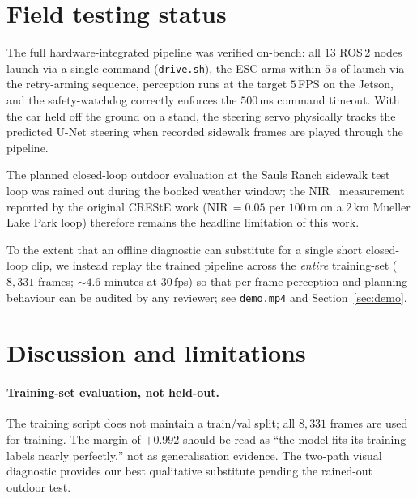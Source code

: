 \documentclass[conference]{IEEEtran}
\begin{document}
\section{Field testing status}
\label{sec:field}

The full hardware-integrated pipeline was verified on-bench: all $13$ ROS\,2
nodes launch via a single command (\texttt{drive.sh}), the ESC arms within
$5$\,s of launch via the retry-arming sequence, perception runs at the
target $5$\,FPS on the Jetson, and the safety-watchdog correctly enforces
the $500$\,ms command timeout. With the car held off the ground on a stand,
the steering servo physically tracks the predicted U-Net steering when
recorded sidewalk frames are played through the pipeline.

The planned closed-loop outdoor evaluation at the Sauls Ranch sidewalk
test loop was rained out during the booked weather window; the
NIR~\cite{creste} measurement reported by the original CREStE work
(NIR\,$= 0.05$ per $100$\,m on a 2\,km Mueller Lake Park loop) therefore
remains the headline limitation of this work.

To the extent that an offline diagnostic can substitute for a single short
closed-loop clip, we instead replay the trained pipeline across the
\emph{entire} training-set ($8{,}331$ frames; $\sim 4.6$ minutes at
$30$\,fps) so that per-frame perception and planning behaviour can be
audited by any reviewer; see \texttt{demo.mp4} and
Section~\ref{sec:demo}.

\section{Discussion and limitations}
\label{sec:discussion}

\paragraph{Training-set evaluation, not held-out.}
The training script does not maintain a train/val split; all $8{,}331$
frames are used for training. The margin of $+0.992$ should be read as
``the model fits its training labels nearly perfectly,'' not as
generalisation evidence. The two-path visual diagnostic provides our best
qualitative substitute pending the rained-out outdoor test.
\end{document}

